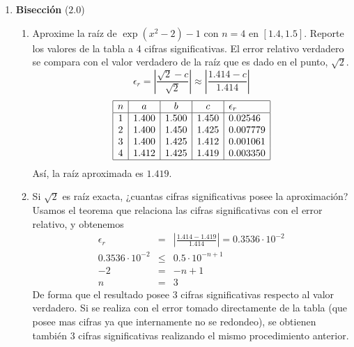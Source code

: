 \documentclass[12pt]{article}
\begin{document}
\begin{enumerate}[leftmargin=*,widest=9]
    \item \textbf{Bisección} ($2.0$)
    \begin{enumerate}[label=\alph*]
    \item Aproxime la raíz de $\exp (x^2 - 2) - 1$ con $n=4$ en $\left[1.4, 1.5\right]$. Reporte los valores de la tabla a 4 cifras significativas.
    El error relativo verdadero se compara con el valor verdadero de la raíz que es dado en el punto, $\sqrt{2}$.
    \[ \epsilon_r = \left| \frac{\sqrt{2} - c}{\sqrt{2}} \right| \approx \left|\frac{1.414 - c}{1.414} \right| \]
    \[
    \begin{array}{|c|c|c|c|l|}
    \hline
    n & a & b & c & \epsilon_r \\
    \hline
 1 & 1.400 & 1.500 & 1.450 & 0.02546\\
 2 & 1.400 & 1.450 & 1.425 & 0.007779\\
 3 & 1.400 & 1.425 & 1.412 & 0.001061 \\
 4 & 1.412 & 1.425 & 1.419 & 0.003350 \\
    \hline
    \end{array}
    \]
    Así, la raíz aproximada es $1.419$.
    \item Si $\sqrt{2}$ es raíz exacta, ¿cuantas cifras significativas posee la aproximación?
    Usamos el teorema que relaciona las cifras significativas con el error relativo, y obtenemos
    \begin{eqnarray*}
    \epsilon_r  & = & \left| \frac{1.414 - 1.419}{1.414} \right| = 0.3536\cdot 10^{-2}  \\
    0.3536\cdot 10^{-2} & \leq & 0.5 \cdot 10^{-n + 1} \\
    -2 & = & -n + 1 \\
    n & = & 3
    \end{eqnarray*}
    De forma que el resultado posee 3 cifras significativas respecto al valor verdadero. Si se realiza con el error tomado directamente de la tabla (que posee mas cifras ya que internamente no se redondeo), se obtienen también 3 cifras significativas realizando el mismo procedimiento anterior.
    \end{enumerate}
  \end{enumerate}
\end{document}
